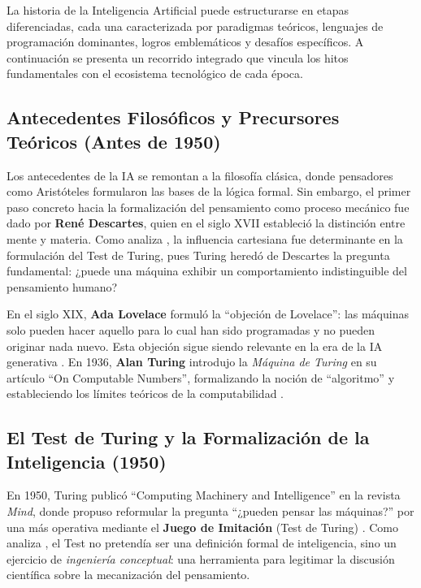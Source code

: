 \documentclass[12pt,a4paper]{article}
\begin{document}
La historia de la Inteligencia Artificial puede estructurarse en etapas diferenciadas, cada una caracterizada por paradigmas teóricos, lenguajes de programación dominantes, logros emblemáticos y desafíos específicos. A continuación se presenta un recorrido integrado que vincula los hitos fundamentales con el ecosistema tecnológico de cada época.

\subsection{Antecedentes Filosóficos y Precursores Teóricos (Antes de 1950)}

Los antecedentes de la IA se remontan a la filosofía clásica, donde pensadores como Aristóteles formularon las bases de la lógica formal. Sin embargo, el primer paso concreto hacia la formalización del pensamiento como proceso mecánico fue dado por \textbf{René Descartes}, quien en el siglo XVII estableció la distinción entre mente y materia. Como analiza \citet{abramson2011}, la influencia cartesiana fue determinante en la formulación del Test de Turing, pues Turing heredó de Descartes la pregunta fundamental: ¿puede una máquina exhibir un comportamiento indistinguible del pensamiento humano?

En el siglo XIX, \textbf{Ada Lovelace} formuló la ``objeción de Lovelace'': las máquinas solo pueden hacer aquello para lo cual han sido programadas y no pueden originar nada nuevo. Esta objeción sigue siendo relevante en la era de la IA generativa \citep{natale2022}. En 1936, \textbf{Alan Turing} introdujo la \textit{Máquina de Turing} en su artículo ``On Computable Numbers'', formalizando la noción de ``algoritmo'' y estableciendo los límites teóricos de la computabilidad \citep{milkowski2022}.

\subsection{El Test de Turing y la Formalización de la Inteligencia (1950)}

En 1950, Turing publicó ``Computing Machinery and Intelligence'' en la revista \textit{Mind}, donde propuso reformular la pregunta ``¿pueden pensar las máquinas?'' por una más operativa mediante el \textbf{Juego de Imitación} (Test de Turing) \citep{turing1950}. Como analiza \citet{milkowski2022}, el Test no pretendía ser una definición formal de inteligencia, sino un ejercicio de \textit{ingeniería conceptual}: una herramienta para legitimar la discusión científica sobre la mecanización del pensamiento.
\end{document}
